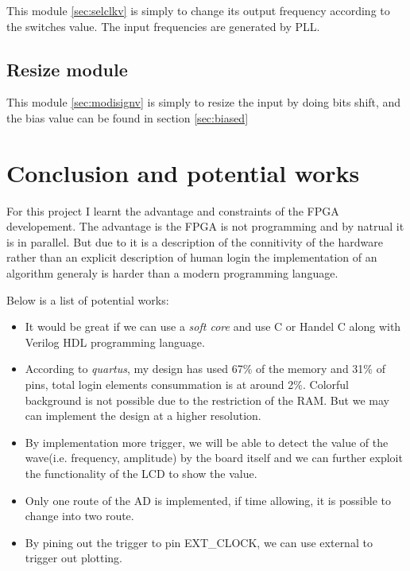 \documentclass[11pt]{scrartcl}
\begin{document}
This module \ref{sec:selclkv} is simply to change its output frequency according to the switches value. The input frequencies are generated by PLL. 

\subsection{Resize module}

This module \ref{sec:modisignv} is simply to resize the input by doing bits shift, and the bias value can be found in section \ref{sec:biased}

\section{Conclusion and potential works}

For this project I learnt the advantage and constraints of the FPGA developement. The advantage is the FPGA is not programming and by natrual it is in parallel. But due to it is a description of the connitivity of the hardware rather than an explicit description of human login the implementation of an algorithm generaly is harder than a modern programming language. 

Below is a list of potential works:
\begin{itemize}
\item It would be great if we can use a \textit{soft core} and use C or Handel C along with Verilog HDL programming language.

\item According to \textit{quartus}, my design has used 67\% of the memory and 31\% of pins, total login elements consummation is at around 2\%. Colorful background is not possible due to the restriction of the RAM. But we may can implement the design at a higher resolution.\\


\item By implementation more trigger, we will be able to detect the value of the wave(i.e. frequency, amplitude) by the board itself and we can further exploit the functionality of the LCD to show the value.\\

\item Only one route of the AD is implemented, if time allowing, it is possible to change into two route.\\

\item By pining out the trigger to pin EXT\_CLOCK, we can use external to trigger out plotting.
\end{itemize}
\end{document}
